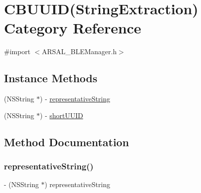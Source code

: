 \hypertarget{categoryCBUUID_07StringExtraction_08}{}\section{C\+B\+U\+U\+ID(String\+Extraction) Category Reference}
\label{categoryCBUUID_07StringExtraction_08}


{\ttfamily \#import $<$A\+R\+S\+A\+L\+\_\+\+B\+L\+E\+Manager.\+h$>$}

\subsection*{Instance Methods}
\begin{DoxyCompactItemize}
\item 
(N\+S\+String $\ast$) -\/ \hyperlink{categoryCBUUID_07StringExtraction_08_a5cba828d2015525ed0742841842f0418}{representative\+String}
\item 
(N\+S\+String $\ast$) -\/ \hyperlink{categoryCBUUID_07StringExtraction_08_a98d5f8fb2e5033d0024b604fd9bc8781}{short\+U\+U\+ID}
\end{DoxyCompactItemize}


\subsection{Method Documentation}
\hypertarget{categoryCBUUID_07StringExtraction_08_a5cba828d2015525ed0742841842f0418}{}\label{categoryCBUUID_07StringExtraction_08_a5cba828d2015525ed0742841842f0418} 
\subsubsection{\texorpdfstring{representative\+String()}{representativeString()}}
{\footnotesize\ttfamily -\/ (N\+S\+String $\ast$) representative\+String \begin{DoxyParamCaption}{ }\end{DoxyParamCaption}}

\hypertarget{categoryCBUUID_07StringExtraction_08_a98d5f8fb2e5033d0024b604fd9bc8781}{}\label{categoryCBUUID_07StringExtraction_08_a98d5f8fb2e5033d0024b604fd9bc8781} 
